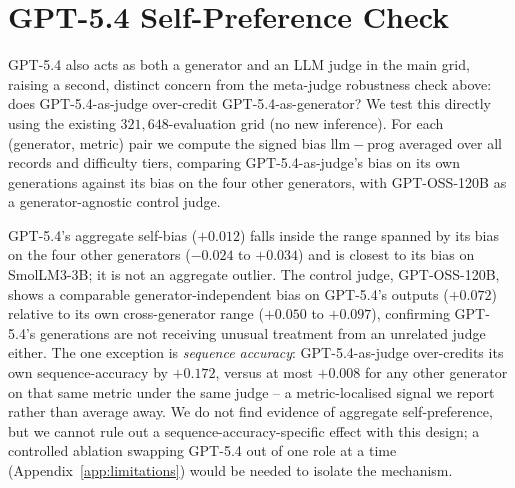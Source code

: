 \section{GPT-5.4 Self-Preference Check}
\label{app:self-preference}

GPT-5.4 also acts as both a generator and an LLM judge in the main grid, raising a second, distinct concern from the meta-judge robustness check above: does GPT-5.4-as-judge over-credit GPT-5.4-as-generator? We test this directly using the existing $321{,}648$-evaluation grid (no new inference). For each (generator, metric) pair we compute the signed bias $\mathrm{llm} - \mathrm{prog}$ averaged over all records and difficulty tiers, comparing GPT-5.4-as-judge's bias on its own generations against its bias on the four other generators, with GPT-OSS-120B as a generator-agnostic control judge.

\begin{table}[h!]
\centering
\small
\setlength{\tabcolsep}{4pt}
\renewcommand{\arraystretch}{1.1}
\caption{Judge=GPT-5.4 bias ($\mathrm{llm\_accuracy} - \mathrm{programmatic\_accuracy}$) by generator, averaged over all difficulty tiers. $^{\ast}$GPT-5.4 judging its own generations.}
\label{tab:self-preference}
\end{table}

GPT-5.4's aggregate self-bias ($+0.012$) falls inside the range spanned by its bias on the four other generators ($-0.024$ to $+0.034$) and is closest to its bias on SmolLM3-3B; it is not an aggregate outlier. The control judge, GPT-OSS-120B, shows a comparable generator-independent bias on GPT-5.4's outputs ($+0.072$) relative to its own cross-generator range ($+0.050$ to $+0.097$), confirming GPT-5.4's generations are not receiving unusual treatment from an unrelated judge either. The one exception is \emph{sequence accuracy}: GPT-5.4-as-judge over-credits its own sequence-accuracy by $+0.172$, versus at most $+0.008$ for any other generator on that same metric under the same judge -- a metric-localised signal we report rather than average away. We do not find evidence of aggregate self-preference, but we cannot rule out a sequence-accuracy-specific effect with this design; a controlled ablation swapping GPT-5.4 out of one role at a time (Appendix~\ref{app:limitations}) would be needed to isolate the mechanism.

